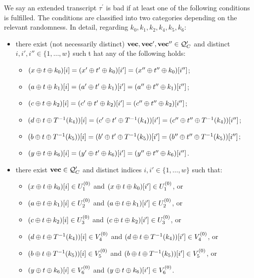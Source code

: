 \begin{definition}
	\label{defn:bad-tau-6-rounds}
	
	We say an extended transcript $\tau^{\prime}$ is bad if at least one of the following conditions is fulfilled. The conditions are classified into two categories depending on the relevant randomness. In detail, regarding $k_0,k_1,k_2,k_4,k_5,k_6$:
	\begin{itemize}[leftmargin=10mm]
		\item[\cone] there exist (not necessarily distinct) $\mathbf{vec},\mathbf{vec}',\mathbf{vec}''\in \mathcal{Q}_{C}'$ and distinct $i, i', i'' \in \{1, \ldots, w\}$ such t hat any of the following holds:
		\begin{itemize}
			\item $(x\oplus t\oplus k_0)[i]=(x'\oplus t'\oplus k_0)[i']=(x''\oplus t''\oplus k_0)[i'']$;
			\item $(a\oplus t\oplus k_1)[i]=(a'\oplus t'\oplus k_1)[i']=(a''\oplus t''\oplus k_1)[i'']$;
			\item $(c\oplus t\oplus k_2)[i]=(c'\oplus t'\oplus k_2)[i']=(c''\oplus t''\oplus k_2)[i'']$;
			\item $(d\oplus t\oplus T^{-1}(k_4))[i]=(c'\oplus t'\oplus T^{-1}(k_4))[i']=(c''\oplus t''\oplus T^{-1}(k_4))[i'']$;
			\item $(b\oplus t\oplus T^{-1}(k_5))[i]=(b'\oplus t'\oplus T^{-1}(k_5))[i']=(b''\oplus t''\oplus T^{-1}(k_5))[i'']$;
			\item $(y\oplus t\oplus k_6)[i]=(y'\oplus t'\oplus k_6)[i']=(y''\oplus t''\oplus k_6)[i'']$.
		\end{itemize}
		\item[\ctwo] there exist $\mathbf{vec} \in \mathcal{Q}_{C}'$ and distinct indices $i, i' \in \{1, \ldots, w\}$ such that:
		\begin{itemize}
			\item $(x\oplus t\oplus k_0)[i]\in U_1^{(0)}$ and $(x\oplus t\oplus k_0)[i']\in U_1^{(0)}$, or
			\item $(a\oplus t \oplus k_1)[i]\in U_{2}^{(0)}$ and $(a\oplus t \oplus k_1)[i']\in U_{2}^{(0)}$, or
			\item $(c\oplus t \oplus k_2)[i]\in U_{3}^{(0)}$ and $(c\oplus t \oplus k_2)[i']\in U_{3}^{(0)}$, or
			\item $(d\oplus t\oplus T^{-1}(k_4))[i]\in V_4^{(0)}$ and
			$(d\oplus t\oplus T^{-1}(k_4))[i']\in V_4^{(0)}$, or
			\item $(b\oplus t\oplus T^{-1}(k_5))[i]\in V_5^{(0)}$ and
			$(b\oplus t\oplus T^{-1}(k_5))[i']\in V_5^{(0)}$, or
			\item $(y\oplus t\oplus k_6)[i]\in V_6^{(0)}$ and $(y\oplus t\oplus k_6)[i']\in V_6^{(0)}$.

\end{itemize}
\end{itemize}
\end{definition}
